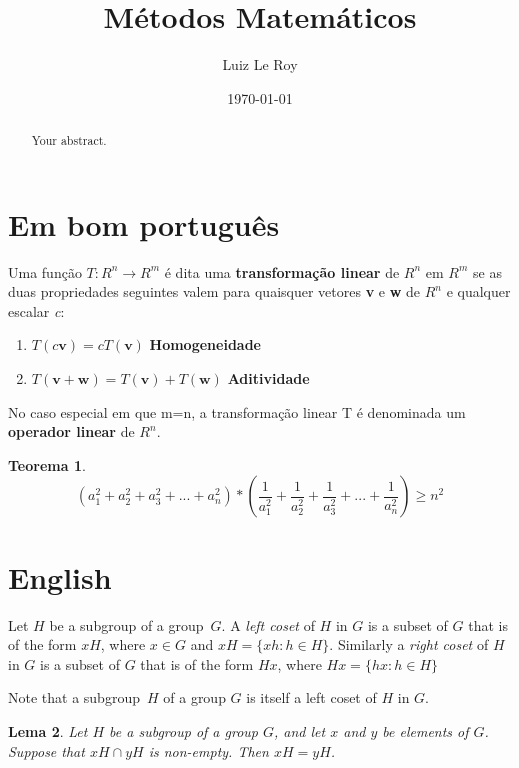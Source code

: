 \documentclass[a4paper]{article}
\title{Métodos Matemáticos}
\author{Luiz Le Roy}
\date{\today}
\newtheorem{theorem}{Teorema}[section]
\newtheorem{lemma}[theorem]{Lema}
\newenvironment{definition}[1][Definição]{\begin{trivlist}
\item[\hskip \labelsep {\bfseries #1}]}{\end{trivlist}}
\begin{document}
\maketitle

\begin{abstract}
Your abstract.
\end{abstract}

\section{Em bom português}
\begin{definition}
Uma função $T:R^n \longrightarrow R^m$ é dita uma \textbf{transformação linear} de $R^n$ em $R^m$ se as duas propriedades seguintes valem para quaisquer vetores \textbf{v} e \textbf{w} de $R^n$ e qualquer escalar \textit{c}:
\begin{enumerate}[label=\roman*]
\item $T(c\textbf{v})=cT(\textbf{v})$ \textbf{Homogeneidade}
\item $T(\textbf{v}+\textbf{w})= T(\textbf{v}) + T(\textbf{w})$ \textbf{Aditividade}
\end{enumerate}
No caso especial em que m=n, a transformação linear T é denominada um \textbf{operador linear} de $R^n$.
\end{definition}

\begin{theorem}
\label{Desigualdade_Quadrados_Inversos}
$$
(a^2_1+a^2_2+a^2_3+ ... +a^2_n) \ast \left(\frac{1}{a^2_1}+\frac{1}{a^2_2}+\frac{1}{a^2_3}+ ... + \frac{1}{a^2_n}\right) \geq n^2
$$
\end{theorem}



\section{English}
\begin{definition}
Let $H$ be a subgroup of a group~$G$.  A \emph{left coset} of $H$ in $G$ is a subset of $G$ that is of the form $xH$, where $x \in G$ and $xH = \{ xh : h \in H \}$. Similarly a \emph{right coset} of $H$ in $G$ is a subset of $G$ that is of the form $Hx$, where $Hx = \{ hx : h \in H \}$
\end{definition}

Note that a subgroup~$H$ of a group $G$ is itself a left coset of $H$ in $G$.

\begin{lemma}
\label{LeftCosetsDisjoint}
Let $H$ be a subgroup of a group $G$, and let $x$ and $y$ be elements of $G$.  Suppose that $xH \cap yH$ is non-empty. Then $xH = yH$.
\end{lemma}
\end{document}
